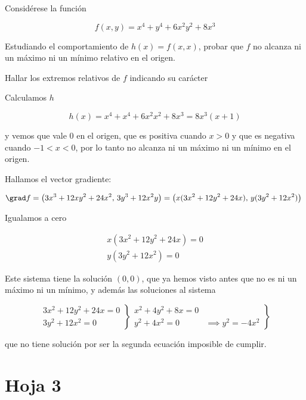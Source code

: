 \begin{problem}[14] Considérese la función

\[ f(x,y) = x^4 + y^4 + 6x^2y^2 + 8 x^3 \]

\ppart Estudiando el comportamiento de $h(x)=f(x,x)$, probar que $f$ no alcanza ni un máximo ni un mínimo relativo en el origen.

\ppart Hallar los extremos relativos de $f$ indicando su carácter

\solution

\spart Calculamos $h$

\[ h(x) = x^4 + x^4 + 6x^2x^2 + 8 x^3 = 8x^3(x + 1) \]

y vemos que vale $0$ en el origen, que es positiva cuando $x>0$ y que es negativa cuando $-1<x<0$, por lo tanto no alcanza ni un máximo ni un mínimo en el origen.

\spart Hallamos el vector gradiente:

\[ \grad f = \left(3x^3 + 12xy^2 + 24x^2,\, 3y^3 + 12x^2y\right) = \left(x(3x^2 + 12y^2 + 24x),\, y(3y^2+12x^2)\right) \]

Igualamos a cero

\[ \left.\begin{matrix}
x(3x^2 + 12y^2 + 24x) = 0 \\
y(3y^2+12x^2) = 0
\end{matrix}\right. \]

Este sistema tiene la solución $(0,0)$, que ya hemos visto antes que no es ni un máximo ni un mínimo, y además las soluciones al sistema

\[ \left.\begin{matrix} 3x^2 + 12y^2 + 24x = 0 \\
3y^2 +12x^2 = 0
\end{matrix}\right\}
\left.\begin{matrix} x^2 + 4y^2 + 8x = 0 &  \\
y^2 +4x^2 = 0 & \implies y^2 = -4x^2
\end{matrix}\right\}  \]

que no tiene solución por ser la segunda ecuación imposible de cumplir.
\end{problem}

\section{Hoja 3}

